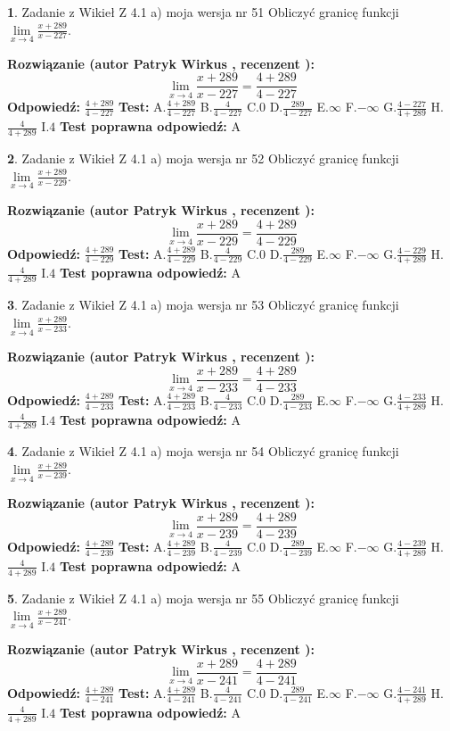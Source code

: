 \documentclass[12pt, a4paper]{article}
\theoremstyle{definition} %
\newtheorem{zad}{}
\newcommand{\zadStart}[1]{\begin{zad}#1\newline}
\newcommand{\zadStop}{\end{zad}}
\newcommand{\rozwStart}[2]{\noindent \textbf{Rozwiązanie (autor #1 , recenzent #2): }\newline}
\newcommand{\rozwStop}{\newline}
\newcommand{\odpStart}{\noindent \textbf{Odpowiedź:}\newline}
\newcommand{\odpStop}{\newline}
\newcommand{\testStart}{\noindent \textbf{Test:}\newline}
\newcommand{\testStop}{\newline}
\newcommand{\kluczStart}{\noindent \textbf{Test poprawna odpowiedź:}\newline}
\newcommand{\kluczStop}{\newline}
\begin{document}
\zadStart{Zadanie z Wikieł Z 4.1 a) moja wersja nr 51}
Obliczyć granicę funkcji $\lim\limits_{x\to4}\frac{x+289}{x-227}$.
\zadStop
\rozwStart{Patryk Wirkus}{}
$$\lim\limits_{x\to4}\frac{x+289}{x-227} = \frac{4+289}{4-227}$$
\rozwStop
\odpStart
$\frac{4+289}{4-227}$
\odpStop
\testStart
A.$\frac{4+289}{4-227}$
B.$\frac{4}{4-227}$
C.$0$
D.$\frac{289}{4-227}$
E.$\infty$
F.$-\infty$
G.$\frac{4-227}{4+289}$
H.$\frac{4}{4+289}$
I.$4$
\testStop
\kluczStart
A
\kluczStop



\zadStart{Zadanie z Wikieł Z 4.1 a) moja wersja nr 52}
Obliczyć granicę funkcji $\lim\limits_{x\to4}\frac{x+289}{x-229}$.
\zadStop
\rozwStart{Patryk Wirkus}{}
$$\lim\limits_{x\to4}\frac{x+289}{x-229} = \frac{4+289}{4-229}$$
\rozwStop
\odpStart
$\frac{4+289}{4-229}$
\odpStop
\testStart
A.$\frac{4+289}{4-229}$
B.$\frac{4}{4-229}$
C.$0$
D.$\frac{289}{4-229}$
E.$\infty$
F.$-\infty$
G.$\frac{4-229}{4+289}$
H.$\frac{4}{4+289}$
I.$4$
\testStop
\kluczStart
A
\kluczStop



\zadStart{Zadanie z Wikieł Z 4.1 a) moja wersja nr 53}
Obliczyć granicę funkcji $\lim\limits_{x\to4}\frac{x+289}{x-233}$.
\zadStop
\rozwStart{Patryk Wirkus}{}
$$\lim\limits_{x\to4}\frac{x+289}{x-233} = \frac{4+289}{4-233}$$
\rozwStop
\odpStart
$\frac{4+289}{4-233}$
\odpStop
\testStart
A.$\frac{4+289}{4-233}$
B.$\frac{4}{4-233}$
C.$0$
D.$\frac{289}{4-233}$
E.$\infty$
F.$-\infty$
G.$\frac{4-233}{4+289}$
H.$\frac{4}{4+289}$
I.$4$
\testStop
\kluczStart
A
\kluczStop



\zadStart{Zadanie z Wikieł Z 4.1 a) moja wersja nr 54}
Obliczyć granicę funkcji $\lim\limits_{x\to4}\frac{x+289}{x-239}$.
\zadStop
\rozwStart{Patryk Wirkus}{}
$$\lim\limits_{x\to4}\frac{x+289}{x-239} = \frac{4+289}{4-239}$$
\rozwStop
\odpStart
$\frac{4+289}{4-239}$
\odpStop
\testStart
A.$\frac{4+289}{4-239}$
B.$\frac{4}{4-239}$
C.$0$
D.$\frac{289}{4-239}$
E.$\infty$
F.$-\infty$
G.$\frac{4-239}{4+289}$
H.$\frac{4}{4+289}$
I.$4$
\testStop
\kluczStart
A
\kluczStop



\zadStart{Zadanie z Wikieł Z 4.1 a) moja wersja nr 55}
Obliczyć granicę funkcji $\lim\limits_{x\to4}\frac{x+289}{x-241}$.
\zadStop
\rozwStart{Patryk Wirkus}{}
$$\lim\limits_{x\to4}\frac{x+289}{x-241} = \frac{4+289}{4-241}$$
\rozwStop
\odpStart
$\frac{4+289}{4-241}$
\odpStop
\testStart
A.$\frac{4+289}{4-241}$
B.$\frac{4}{4-241}$
C.$0$
D.$\frac{289}{4-241}$
E.$\infty$
F.$-\infty$
G.$\frac{4-241}{4+289}$
H.$\frac{4}{4+289}$
I.$4$
\testStop
\kluczStart
A
\kluczStop
\end{document}
